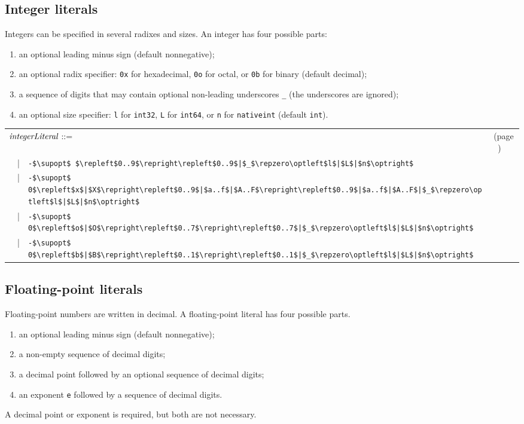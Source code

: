 \subsection{Integer literals}

Integers can be specified in several radixes and sizes.  An integer has four possible parts:
\begin{enumerate}
\item an optional leading minus sign (default nonnegative);
\item an optional radix specifier: \hbox{\lstinline/0x/} for hexadecimal, \hbox{\lstinline/0o/} for octal, or \hbox{\lstinline/0b/} for binary (default decimal);
\item a sequence of digits that may contain optional non-leading underscores \hbox{\lstinline/_/} (the underscores are ignored);
\item an optional size specifier: \hbox{\lstinline/l/} for \hbox{\lstinline/int32/}, \hbox{\lstinline/L/} for \hbox{\lstinline/int64/}, or \hbox{\lstinline/n/} for \hbox{\lstinline/nativeint/} (default \hbox{\lstinline/int/}).
\end{enumerate}

\begin{center}
\begin{tabular}{rcll}
\multicolumn{3}{l}{$\textit{\rmfamily integerLiteral}$ ::=} & (page~\pageref{literal:integer})\\
& | & \hbox{\lstinline/-$\supopt$ $\repleft$0..9$\repright\repleft$0..9$|$_$\repzero\optleft$l$|$L$|$n$\optright$/}\\
& | & \hbox{\lstinline/-$\supopt$ 0$\repleft$x$|$X$\repright\repleft$0..9$|$a..f$|$A..F$\repright\repleft$0..9$|$a..f$|$A..F$|$_$\repzero\optleft$l$|$L$|$n$\optright$/}\\
& | & \hbox{\lstinline/-$\supopt$ 0$\repleft$o$|$O$\repright\repleft$0..7$\repright\repleft$0..7$|$_$\repzero\optleft$l$|$L$|$n$\optright$/}\\
& | & \hbox{\lstinline/-$\supopt$ 0$\repleft$b$|$B$\repright\repleft$0..1$\repright\repleft$0..1$|$_$\repzero\optleft$l$|$L$|$n$\optright$/}
\end{tabular}
\end{center}

\subsection{Floating-point literals}

Floating-point numbers are written in decimal.  A floating-point literal has four possible parts.
\begin{enumerate}
\item an optional leading minus sign (default nonnegative);
\item a non-empty sequence of decimal digits;
\item a decimal point followed by an optional sequence of decimal digits;
\item an exponent \hbox{\lstinline/e/} followed by a sequence of decimal digits.
\end{enumerate}
%
A decimal point or exponent is required, but both are not necessary.


